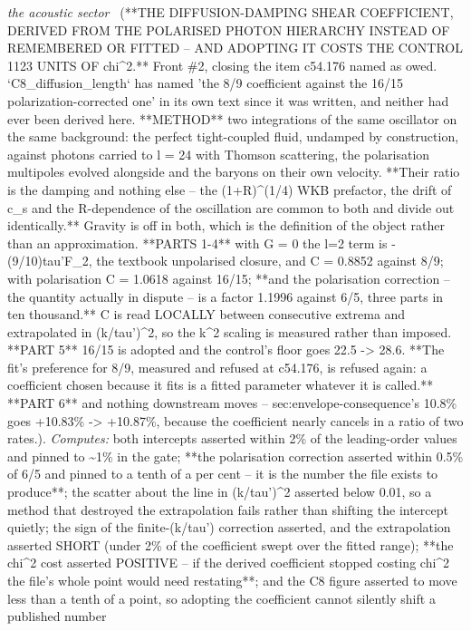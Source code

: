 \begin{description}
\textit{the acoustic sector} \ (**THE DIFFUSION-DAMPING SHEAR COEFFICIENT, DERIVED FROM THE POLARISED PHOTON HIERARCHY INSTEAD OF REMEMBERED OR FITTED -- AND ADOPTING IT COSTS THE CONTROL 1123 UNITS OF chi\textasciicircum{}2.** Front \#2, closing the item c54.176 named as owed. `C8\_diffusion\_length` has named 'the 8/9 coefficient against the 16/15 polarization-corrected one' in its own text since it was written, and neither had ever been derived here. **METHOD** two integrations of the same oscillator on the same background: the perfect tight-coupled fluid, undamped by construction, against photons carried to l = 24 with Thomson scattering, the polarisation multipoles evolved alongside and the baryons on their own velocity. **Their ratio is the damping and nothing else -- the (1+R)\textasciicircum{}(1/4) WKB prefactor, the drift of c\_s and the R-dependence of the oscillation are common to both and divide out identically.** Gravity is off in both, which is the definition of the object rather than an approximation. **PARTS 1-4** with G = 0 the l=2 term is -(9/10)tau'F\_2, the textbook unpolarised closure, and C = 0.8852 against 8/9; with polarisation C = 1.0618 against 16/15; **and the polarisation correction -- the quantity actually in dispute -- is a factor 1.1996 against 6/5, three parts in ten thousand.** C is read LOCALLY between consecutive extrema and extrapolated in (k/tau')\textasciicircum{}2, so the k\textasciicircum{}2 scaling is measured rather than imposed. **PART 5** 16/15 is adopted and the control's floor goes 22.5 -> 28.6. **The fit's preference for 8/9, measured and refused at c54.176, is refused again: a coefficient chosen because it fits is a fitted parameter whatever it is called.** **PART 6** and nothing downstream moves -- sec:envelope-consequence's 10.8\% goes +10.83\% -> +10.87\%, because the coefficient nearly cancels in a ratio of two rates.). 
\emph{Computes:} both intercepts asserted within 2\% of the leading-order values and pinned to \textasciitilde{}1\% in the gate; **the polarisation correction asserted within 0.5\% of 6/5 and pinned to a tenth of a per cent -- it is the number the file exists to produce**; the scatter about the line in (k/tau')\textasciicircum{}2 asserted below 0.01, so a method that destroyed the extrapolation fails rather than shifting the intercept quietly; the sign of the finite-(k/tau') correction asserted, and the extrapolation asserted SHORT (under 2\% of the coefficient swept over the fitted range); **the chi\textasciicircum{}2 cost asserted POSITIVE -- if the derived coefficient stopped costing chi\textasciicircum{}2 the file's whole point would need restating**; and the C8 figure asserted to move less than a tenth of a point, so adopting the coefficient cannot silently shift a published number

\end{description}
